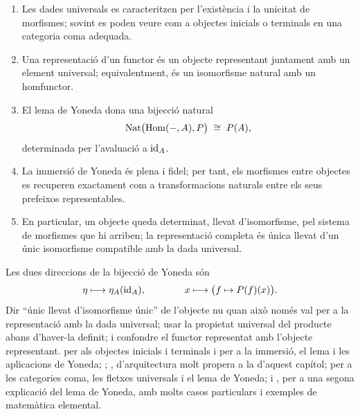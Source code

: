 \begin{resumcap}
\begin{enumerate}
  \item Les dades universals es caracteritzen per l'existència i la unicitat de morfismes; sovint es poden veure com a objectes inicials o terminals en una categoria coma adequada.
  \item Una representació d'un functor és un objecte representant juntament amb un element universal; equivalentment, és un isomorfisme natural amb un homfunctor.
  \item El lema de Yoneda dona una bijecció natural
  \[
  \operatorname{Nat}\bigl(\operatorname{Hom}(-,A),P\bigr)\;\cong\;P(A),
  \]
  determinada per l'avaluació a $\operatorname{id}_A$.
  \item La immersió de Yoneda és plena i fidel; per tant, els morfismes entre objectes es recuperen exactament com a transformacions naturals entre els seus prefeixos representables.
  \item En particular, un objecte queda determinat, llevat d'isomorfisme, pel sistema de morfismes que hi arriben; la representació completa és única llevat d'un únic isomorfisme compatible amb la dada universal.
\end{enumerate}
 Les dues direccions de la bijecció de Yoneda són
\[
\eta\longmapsto\eta_A(\operatorname{id}_A),
\qquad\qquad
x\longmapsto\bigl(f\mapsto P(f)(x)\bigr).
\]
 Dir \enquote{únic llevat d'isomorfisme únic} de l'objecte nu quan això només val per a la representació amb la dada universal; usar la propietat universal del producte abans d'haver-la definit; i confondre el functor representat amb l'objecte representant.
 \cite[§2.2 i §§8.1--8.4]{awodey} per als objectes inicials i terminals i per a la immersió, el lema i les aplicacions de Yoneda; \cite[§§4.1--4.3]{leinster}; \cite[cap.~2]{riehl}, d'arquitectura molt propera a la d'aquest capítol; \cite[II.6 i III.1--III.2]{maclane} per a les categories coma, les fletxes universals i el lema de Yoneda; i \cite[cap.~2]{perrone-notes}, per a una segona explicació del lema de Yoneda, amb molts casos particulars i exemples de matemàtica elemental.
\end{resumcap}
